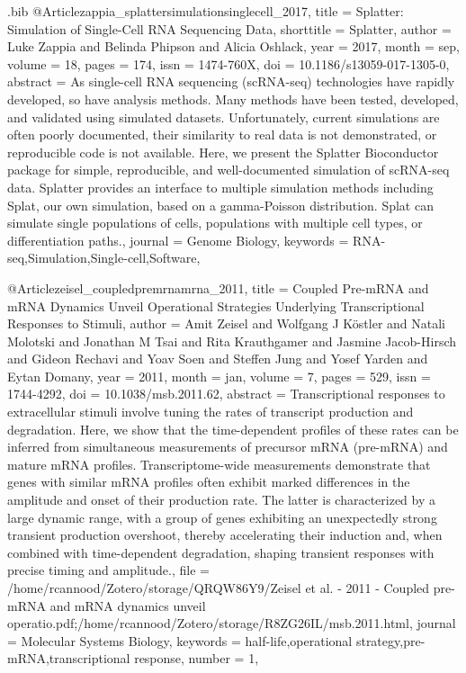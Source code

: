\documentclass[
  table,
  10pt,
  a4paper]{article}
\begin{document}
\begin{filecontents}{\jobname.bib}
@Article{zappia_splattersimulationsinglecell_2017,
	title = {Splatter: {{Simulation}} of {{Single}}-{{Cell RNA Sequencing Data}}},
	shorttitle = {Splatter},
	author = {Luke Zappia and Belinda Phipson and Alicia Oshlack},
	year = {2017},
	month = {sep},
	volume = {18},
	pages = {174},
	issn = {1474-760X},
	doi = {10.1186/s13059-017-1305-0},
	abstract = {As single-cell RNA sequencing (scRNA-seq) technologies have rapidly developed, so have analysis methods. Many methods have been tested, developed, and validated using simulated datasets. Unfortunately, current simulations are often poorly documented, their similarity to real data is not demonstrated, or reproducible code is not available. Here, we present the Splatter Bioconductor package for simple, reproducible, and well-documented simulation of scRNA-seq data. Splatter provides an interface to multiple simulation methods including Splat, our own simulation, based on a gamma-Poisson distribution. Splat can simulate single populations of cells, populations with multiple cell types, or differentiation paths.},
	journal = {Genome Biology},
	keywords = {RNA-seq,Simulation,Single-cell,Software},
}

@Article{zeisel_coupledpremrnamrna_2011,
	title = {Coupled Pre-{{mRNA}} and {{mRNA}} Dynamics Unveil Operational Strategies Underlying Transcriptional Responses to Stimuli},
	author = {Amit Zeisel and Wolfgang J K{\"o}stler and Natali Molotski and Jonathan M Tsai and Rita Krauthgamer and Jasmine Jacob-Hirsch and Gideon Rechavi and Yoav Soen and Steffen Jung and Yosef Yarden and Eytan Domany},
	year = {2011},
	month = {jan},
	volume = {7},
	pages = {529},
	issn = {1744-4292},
	doi = {10.1038/msb.2011.62},
	abstract = {Transcriptional responses to extracellular stimuli involve tuning the rates of transcript production and degradation. Here, we show that the time-dependent profiles of these rates can be inferred from simultaneous measurements of precursor mRNA (pre-mRNA) and mature mRNA profiles. Transcriptome-wide measurements demonstrate that genes with similar mRNA profiles often exhibit marked differences in the amplitude and onset of their production rate. The latter is characterized by a large dynamic range, with a group of genes exhibiting an unexpectedly strong transient production overshoot, thereby accelerating their induction and, when combined with time-dependent degradation, shaping transient responses with precise timing and amplitude.},
	file = {/home/rcannood/Zotero/storage/QRQW86Y9/Zeisel et al. - 2011 - Coupled pre-mRNA and mRNA dynamics unveil operatio.pdf;/home/rcannood/Zotero/storage/R8ZG26IL/msb.2011.html},
	journal = {Molecular Systems Biology},
	keywords = {half-life,operational strategy,pre-mRNA,transcriptional response},
	number = {1},
}


\end{filecontents}
\end{document}

